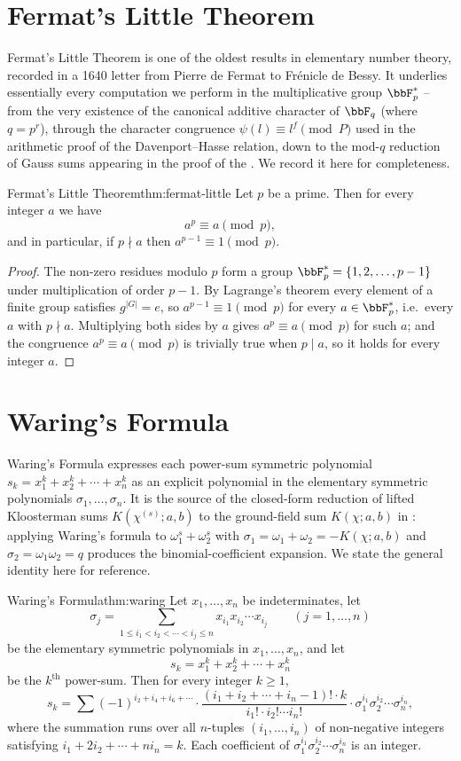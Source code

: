 \section{Fermat's Little Theorem}
Fermat's Little Theorem is one of the oldest results in elementary number theory, recorded in a 1640 letter from Pierre de Fermat to Fr\'{e}nicle de Bessy. It underlies essentially every computation we perform in the multiplicative group $\bbF_p^*$ -- from the very existence of the canonical additive character of $\bbF_q$ (where $q=p^r$), through the character congruence $\psi(l)\equiv l^f\pmod P$ used in the arithmetic proof of the Davenport--Hasse relation, down to the mod-$q$ reduction of Gauss sums appearing in the proof of the \QRthm. We record it here for completeness.
\begin{Theorem}{Fermat's Little Theorem}{thm:fermat-little}%
  Let $p$ be a prime. Then for every integer $a$ we have $$a^p\equiv a\pmod p,$$ and in particular, if $p\nmid a$ then $a^{p-1}\equiv 1\pmod p$.
\end{Theorem}
\begin{proof}
  The non-zero residues modulo $p$ form a group $\bbF_p^*=\{1,2,\dots,p-1\}$ under multiplication of order $p-1$. By Lagrange's theorem every element of a finite group satisfies $g^{|G|}=e$, so $a^{p-1}\equiv 1\pmod p$ for every $a\in\bbF_p^*$, i.e.\ every $a$ with $p\nmid a$. Multiplying both sides by $a$ gives $a^p\equiv a\pmod p$ for such $a$; and the congruence $a^p\equiv a\pmod p$ is trivially true when $p\mid a$, so it holds for every integer $a$.
\end{proof}

\section{Waring's Formula}
Waring's Formula expresses each power-sum symmetric polynomial $s_k=x_1^k+x_2^k+\cdots+x_n^k$ as an explicit polynomial in the elementary symmetric polynomials $\sigma_1,\dots,\sigma_n$. It is the source of the closed-form reduction of lifted Kloosterman sums $K(\chi^{(s)};a,b)$ to the ground-field sum $K(\chi;a,b)$ in : applying Waring's formula to $\omega_1^s+\omega_2^s$ with $\sigma_1=\omega_1+\omega_2=-K(\chi;a,b)$ and $\sigma_2=\omega_1\omega_2=q$ produces the binomial-coefficient expansion. We state the general identity here for reference.
\begin{Theorem}{Waring's Formula}{thm:waring}%
  Let $x_1,\dots,x_n$ be indeterminates, let $$\sigma_j=\sum_{1\leq i_1<i_2<\cdots<i_j\leq n}x_{i_1}x_{i_2}\cdots x_{i_j}\qquad (j=1,\dots,n)$$ be the elementary symmetric polynomials in $x_1,\dots,x_n$, and let $$s_k=x_1^k+x_2^k+\cdots+x_n^k$$ be the $k^{\text{th}}$ power-sum. Then for every integer $k\geq 1$,
  $$s_k=\sum(-1)^{i_2+i_4+i_6+\cdots}\cdot \frac{(i_1+i_2+\cdots+i_n-1)!\cdot k}{i_1!\cdot i_2!\cdots i_n!}\cdot \sigma_1^{i_1}\sigma_2^{i_2}\cdots \sigma_n^{i_n},$$
  where the summation runs over all $n$-tuples $(i_1,\dots,i_n)$ of non-negative integers satisfying $i_1+2i_2+\cdots+ni_n=k$. Each coefficient of $\sigma_1^{i_1}\sigma_2^{i_2}\cdots \sigma_n^{i_n}$ is an integer.
\end{Theorem}